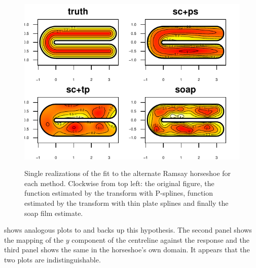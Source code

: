 \begin{figure}
\centering
\includegraphics[width=5in, trim=0in 0in 0in 0in]{figs/altramsaycomp.pdf}\\
\caption{Single realizations of the fit to the alternate Ramsay horseshoe for each method. Clockwise from top left: the original figure, the function estimated by the \sch transform with P-splines, function estimated by the \sch transform with thin plate splines and finally the soap film estimate.}
\label{altramsaycomp}
\end{figure}

 shows analogous plots to  and backs up this hypothesis. The second panel shows the mapping of the $y$ component of the centreline against the response and the third panel shows the same in the horseshoe's own domain. It appears that the two plots are indistinguishable.


